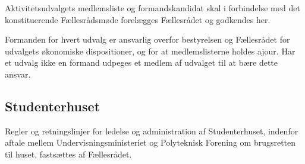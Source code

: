 \begin{list}
 Aktivitetsudvalgets medlemsliste og formandskandidat skal i forbindelse med det konstituerende Fællesrådsmøde forelægges Fællesrådet og godkendes her.

\item Formanden for hvert udvalg er ansvarlig overfor bestyrelsen og Fællesrådet for udvalgets økonomiske dispositioner, og for at medlemslisterne holdes ajour. Har et udvalg ikke en formand udpeges et medlem af udvalget til at bære dette ansvar.


\subsection{Studenterhuset}
\item Regler og retningslinjer for ledelse og administration af Studenterhuset, indenfor aftale mellem Undervisningsministeriet og Polyteknisk Forening om brugsretten til huset, fastsættes af Fællesrådet.




\end{list}
